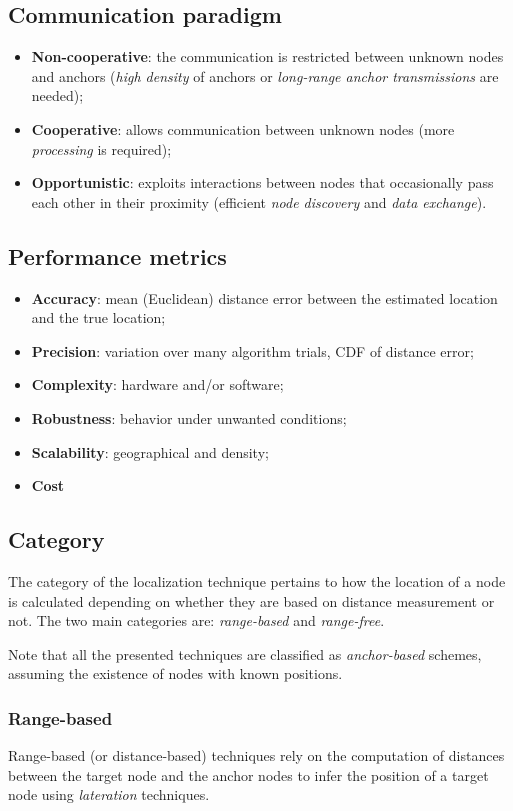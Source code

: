 \documentclass[a4paper,12pt]{article}
\begin{document}
\subsection{Communication paradigm}
\begin{itemize}
  \item \textbf{Non-cooperative}: the communication is restricted between unknown nodes and anchors (\textit{high density} of anchors or \textit{long-range anchor transmissions} are needed);
  \item \textbf{Cooperative}: allows communication between unknown nodes (more \textit{processing} is required);
  \item \textbf{Opportunistic}: exploits interactions between nodes that occasionally pass each other in their proximity (efficient \textit{node discovery} and \textit{data exchange}).
\end{itemize}

\subsection{Performance metrics}
\begin{itemize}
  \item \textbf{Accuracy}: mean (Euclidean) distance error between the estimated location and the true location;
  \item \textbf{Precision}: variation over many algorithm trials, CDF of distance error;
  \item \textbf{Complexity}: hardware and/or software;
  \item \textbf{Robustness}: behavior under unwanted conditions;
  \item \textbf{Scalability}: geographical and density;
  \item \textbf{Cost}
\end{itemize}

\subsection{Category}
The category of the localization technique pertains to how the location of a node is calculated depending on whether they are based on distance measurement or not. The two main categories are: \textit{range-based} and \textit{range-free}.

Note that all the presented techniques are classified as \textit{anchor-based} schemes, assuming the existence of nodes with known positions.

\subsubsection{Range-based}
Range-based (or distance-based) techniques rely on the computation of distances between the target node and the anchor nodes to infer the position of a target node using \textit{lateration} techniques.
\end{document}
